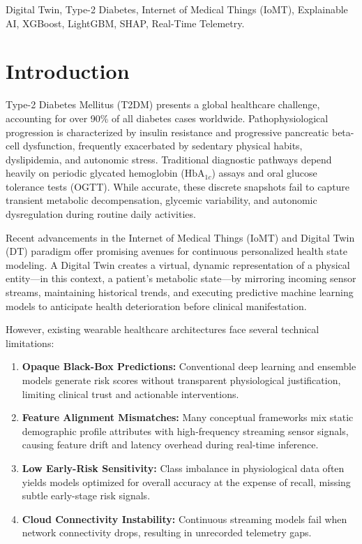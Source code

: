 \documentclass[conference]{IEEEtran}
\begin{document}
\begin{IEEEkeywords}
Digital Twin, Type-2 Diabetes, Internet of Medical Things (IoMT), Explainable AI, XGBoost, LightGBM, SHAP, Real-Time Telemetry.
\end{IEEEkeywords}

\section{Introduction}
Type-2 Diabetes Mellitus (T2DM) presents a global healthcare challenge, accounting for over 90\% of all diabetes cases worldwide. Pathophysiological progression is characterized by insulin resistance and progressive pancreatic beta-cell dysfunction, frequently exacerbated by sedentary physical habits, dyslipidemia, and autonomic stress. Traditional diagnostic pathways depend heavily on periodic glycated hemoglobin ($\text{HbA}_{1c}$) assays and oral glucose tolerance tests (OGTT). While accurate, these discrete snapshots fail to capture transient metabolic decompensation, glycemic variability, and autonomic dysregulation during routine daily activities.

Recent advancements in the Internet of Medical Things (IoMT) and Digital Twin (DT) paradigm offer promising avenues for continuous personalized health state modeling. A Digital Twin creates a virtual, dynamic representation of a physical entity—in this context, a patient's metabolic state—by mirroring incoming sensor streams, maintaining historical trends, and executing predictive machine learning models to anticipate health deterioration before clinical manifestation.

However, existing wearable healthcare architectures face several technical limitations:
\begin{enumerate}
    \item \textbf{Opaque Black-Box Predictions:} Conventional deep learning and ensemble models generate risk scores without transparent physiological justification, limiting clinical trust and actionable interventions.
    \item \textbf{Feature Alignment Mismatches:} Many conceptual frameworks mix static demographic profile attributes with high-frequency streaming sensor signals, causing feature drift and latency overhead during real-time inference.
    \item \textbf{Low Early-Risk Sensitivity:} Class imbalance in physiological data often yields models optimized for overall accuracy at the expense of recall, missing subtle early-stage risk signals.
    \item \textbf{Cloud Connectivity Instability:} Continuous streaming models fail when network connectivity drops, resulting in unrecorded telemetry gaps.
\end{enumerate}
\end{document}
